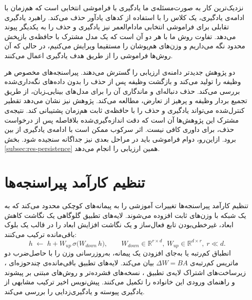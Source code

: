 نزدیک‌ترین کار به صورت‌مسئله‌ی ما {یادگیری با فراموشی انتخابی} \cite{shibata2021lsf} است که هم‌زمان با ادامه‌ی یادگیری، یک کلاس را با استفاده از کدهای یادآور حذف می‌کند. راهبرد یادگیری تقابلی برای فراموشی انتخابی مادام‌العمر \cite{shan2024contrastive} نیز یادگیری و حذف را به یکدیگر پیوند می‌دهد. تفاوت روش ما با هر دو آن است که یک مدل مشترک با حافظه‌ی بازپخش محدود نگه می‌داریم و وزن‌های هم‌پوشان را مستقیما ویرایش می‌کنیم، در حالی که آن روش‌ها فراموشی را از طریق هدف یادگیری اعمال می‌کنند.

دو پژوهش جدیدتر دامنه‌ی ارزیابی را گسترش می‌دهند.  \cite{adhikari2026uncle} پیراسنجه‌های مخصوص هر وظیفه را تولید می‌کند و {بازگشت وظیفه پس از حذف} را بدون داده‌های نگه‌داری‌شده بررسی می‌کند.  \cite{lin2026cata} حذف دنباله‌ای و ماندگاری آن را برای مدل‌های بینایی‌ـ‌زبان، از طریق تجمیع بردار وظیفه و پرهیز از تعارض، مطالعه می‌کند. پژوهش \cite{chatterjee2024unified} نیز نشان می‌دهد تقطیر کنترل‌شده می‌تواند یادگیری و حذف را با حافظه‌ی ثابت هم‌زمان پشتیبانی کند. نتیجه‌ی مشترک این پژوهش‌ها آن است که دقت اندازه‌گیری‌شده بلافاصله پس از درخواست حذف، برای داوری کافی نیست. اثر سرکوب ممکن است با ادامه‌ی یادگیری از بین برود. ازاین‌رو، دوام فراموشی باید در مراحل بعدی نیز جداگانه سنجیده شود. بخش \ref{subsec:res-persistence} همین ارزیابی را انجام می‌دهد.

\section{تنظیم کارآمد پیراسنجه‌ها}
\label{sec:lit-peft}

{تنظیم کارآمد پیراسنجه‌ها} تغییرات آموزشی را به پیمانه‌های کوچکی محدود می‌کند که به یک شبکه با وزن‌های ثابت افزوده می‌شوند. {لایه‌های تطبیق گلوگاهی} \cite{houlsby2019parameter} یک نگاشت کاهش ابعاد، غیرخطی‌بودن تابع فعال‌ساز  \cite{nair2010relu} و یک نگاشت افزایش ابعاد را در قالب یک بلوک باقی‌مانده ترکیب می‌کنند:
\begin{equation}
	\label{eq:adapter}
	h \;\leftarrow\; h + W_{up}\,\sigma\!\big(W_{down}\,h\big),
	\qquad W_{down}\in\mathbb{R}^{r\times d},\ W_{up}\in\mathbb{R}^{d\times r},\ r\ll d.
\end{equation}
{انطباق کم‌رتبه} یا  \cite{hu2021lora} به‌جای افزودن یک پیمانه، به‌روزرسانی وزن را با حاصل‌ضرب دو ماتریس کم‌رتبه‌ی $\Delta W=BA$ بیان می‌کند. لایه‌های تطبیق باقی‌مانده‌ی چندحوزه‌ای \cite{rebuffi2017residualadapters}، زیرساخت‌های اشتراک لایه‌ی تطبیق \cite{pfeiffer2020adapterhub}، نسخه‌های فشرده‌تر \cite{mahabadi2021compacter,ruckle2021adapterdrop} و روش‌های مبتنی بر پیشوند و راهنمای ورودی \cite{li2021prefixtuning,lester2021prompttuning} این خانواده را تکمیل می‌کنند. پیش‌نویس اخیر  \cite{rachapudi2026bidlora} ترکیب مشابهی از یادگیری پیوسته و یادگیری‌زدایی را بررسی می‌کند.

